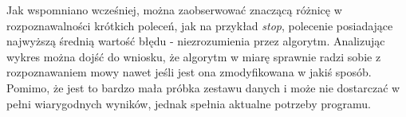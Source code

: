 Jak wspomniano wcześniej, można zaobserwować znaczącą różnicę w rozpoznawalności krótkich poleceń, jak na przykład \textit{stop}, polecenie posiadające najwyższą średnią wartość błędu - niezrozumienia przez algorytm. Analizując wykres można dojść do wniosku, że algorytm w miarę sprawnie radzi sobie z rozpoznawaniem mowy nawet jeśli jest ona zmodyfikowana w jakiś sposób. Pomimo, że jest to bardzo mała próbka zestawu danych i może nie dostarczać w pełni wiarygodnych wyników, jednak spełnia aktualne potrzeby programu.





